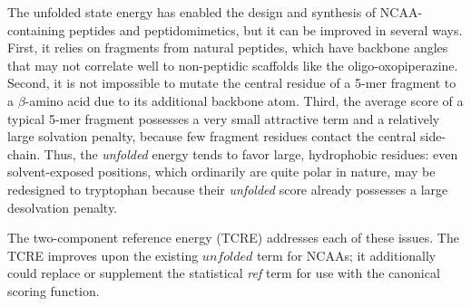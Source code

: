 The unfolded state energy has enabled the design and synthesis of NCAA-containing peptides and peptidomimetics\cite{lao_rational_2014,drew_adding_2013}, but it can be improved in several ways.
First, it relies on fragments from natural peptides, which have backbone angles that may not correlate well to non-peptidic scaffolds like the oligo-oxopiperazine.
Second, it is not impossible to mutate the central residue of a 5-mer fragment to a $\beta$-amino acid due to its additional backbone atom.
Third, the average score of a typical 5-mer fragment possesses a very small attractive term and a relatively large solvation penalty, because few fragment residues contact the central side-chain. 
Thus, the \textit{unfolded} energy tends to favor large, hydrophobic residues: even solvent-exposed positions, which ordinarily are quite polar in nature, may be redesigned to tryptophan because their \textit{unfolded} score already possesses a large desolvation penalty.

The two-component reference energy (TCRE) addresses each of these issues.
The TCRE improves upon the existing $unfolded$ term for NCAAs; it additionally could replace or supplement the statistical \textit{ref} term for use with the canonical scoring function.



